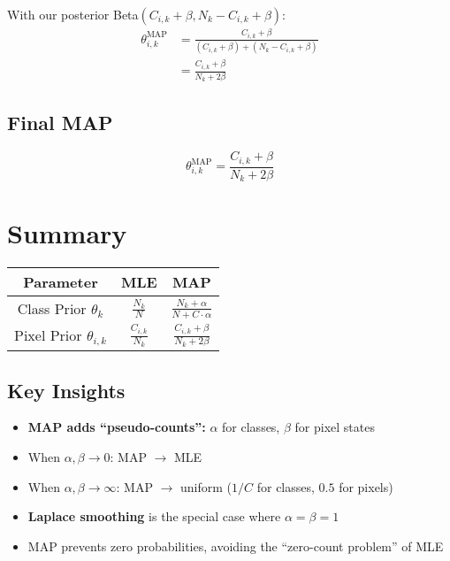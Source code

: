 \documentclass[11pt]{article}
\begin{document}
With our posterior Beta$(C_{i,k} + \beta, N_k - C_{i,k} + \beta)$:
\begin{align}
\theta_{i,k}^{\text{MAP}} &= \frac{C_{i,k} + \beta}{(C_{i,k} + \beta) + (N_k - C_{i,k} + \beta)} \\
&= \frac{C_{i,k} + \beta}{N_k + 2\beta}
\end{align}

\subsection{Final MAP}
\begin{equation}
\boxed{\theta_{i,k}^{\text{MAP}} = \frac{C_{i,k} + \beta}{N_k + 2\beta}}
\end{equation}

\section{Summary}

\begin{center}
\begin{tabular}{|c|c|c|}
\hline
\textbf{Parameter} & \textbf{MLE} & \textbf{MAP} \\
\hline
Class Prior $\theta_k$ & $\displaystyle\frac{N_k}{N}$ & $\displaystyle\frac{N_k + \alpha}{N + C \cdot \alpha}$ \\
\hline
Pixel Prior $\theta_{i,k}$ & $\displaystyle\frac{C_{i,k}}{N_k}$ & $\displaystyle\frac{C_{i,k} + \beta}{N_k + 2\beta}$ \\
\hline
\end{tabular}
\end{center}

\subsection{Key Insights}
\begin{itemize}
\item \textbf{MAP adds ``pseudo-counts'':} $\alpha$ for classes, $\beta$ for pixel states
\item When $\alpha, \beta \to 0$: MAP $\to$ MLE
\item When $\alpha, \beta \to \infty$: MAP $\to$ uniform ($1/C$ for classes, $0.5$ for pixels)
\item \textbf{Laplace smoothing} is the special case where $\alpha = \beta = 1$
\item MAP prevents zero probabilities, avoiding the ``zero-count problem'' of MLE
\end{itemize}
\end{document}
